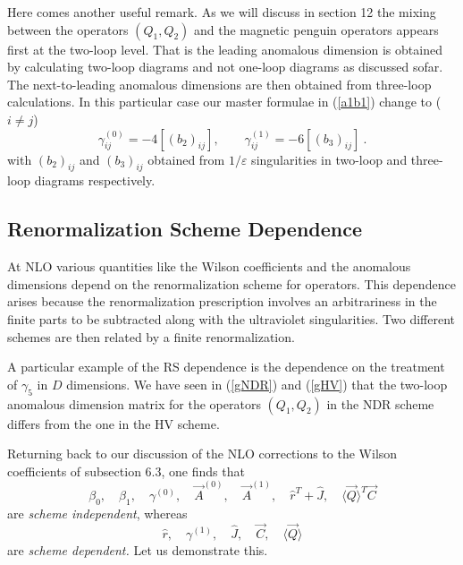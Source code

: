 \documentclass[12pt]{article}
\def\gf{\gamma_5}
\begin{document}
\begin{itemize}
\begin{itemize}
\begin{itemize}
Here comes another useful remark. As we will discuss in section 12
the mixing between the operators $(Q_1,Q_2)$ and the magnetic
penguin operators appears first at the two-loop level. That is
the leading anomalous dimension is obtained by calculating two-loop
diagrams and not one-loop diagrams as discussed sofar.
The next-to-leading anomalous dimensions are then obtained from
three-loop calculations. In this particular case our master
formulae in (\ref{a1b1})  change to ($i\not=j$)
\begin{equation}\label{a1b1m}
\gamma^{(0)}_{ij}=-4[(b_2)_{ij}],
\quad\quad
\gamma^{(1)}_{ij}=-6[(b_3)_{ij}]~.  
\end{equation}
with $(b_2)_{ij}$ and $(b_3)_{ij}$ obtained from $1/\varepsilon$
singularities in two-loop and three-loop diagrams respectively.

\subsection{Renormalization Scheme Dependence}
At NLO various quantities like 
the Wilson coefficients
and the anomalous dimensions depend on the renormalization scheme for
operators.
This dependence  arises because the renormalization
prescription involves an arbitrariness in the finite parts to be
subtracted along with the ultraviolet singularities.  
Two different schemes are then related by a finite renormalization.  

A particular example of the RS  dependence is the dependence on the
treatment of $\gf$ in $D$ dimensions. We have seen in (\ref{gNDR})
and (\ref{gHV}) that the two-loop anomalous dimension matrix for
the operators $(Q_1,Q_2)$ in the NDR scheme differs from the one
in the HV scheme. 

Returning back to our discussion of the NLO corrections to the
Wilson coefficients of subsection 6.3, one finds that 
\begin{equation}\label{rsi}
\beta_0,\quad\beta_1,\quad\gamma^{(0)},\quad\vec A^{(0)},\quad
\vec A^{(1)},\quad \hat r^T+\hat J,\quad\langle\vec Q\rangle^T\vec C  
\end{equation}
are {\it scheme independent}, whereas
 \begin{equation}\label{rsd}
\hat r,\quad\gamma^{(1)},\quad \hat J,\quad\vec C,\quad\langle\vec Q\rangle 
\end{equation}
are {\it scheme dependent.} Let us demonstrate this.


\end{itemize}
\end{itemize}
\end{itemize}
\end{document}

